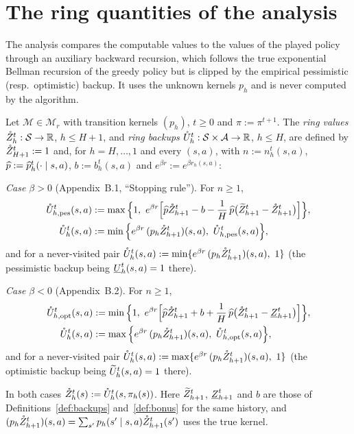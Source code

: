 \section{The ring quantities of the analysis}
\label{sec:algorithm_ring}

The analysis compares the computable values to the values of the played policy through an
auxiliary backward recursion, which follows the true exponential Bellman recursion of the
greedy policy but is clipped by the empirical pessimistic (resp.\ optimistic) backup. It uses
the unknown kernels $p_h$ and is never computed by the algorithm.

\begin{definition}\label{def:ring}
\leanok
{}
Let $\mathcal M \in \mathcal M_r$ with transition kernels $(p_h)$, $t \ge 0$ and $\pi := \pi^{t+1}$. The
\emph{ring values} $\mathring{Z}^t_h : \mathcal{S} \to \mathbb{R}$, $h \le H + 1$, and \emph{ring backups}
$\mathring{U}^t_h : \mathcal{S} \times \mathcal{A} \to \mathbb{R}$, $h \le H$, are defined by $\mathring{Z}^t_{H+1} := 1$ and, for $h = H, \dots, 1$
and every $(s, a)$, with $n := n_h^t(s, a)$, $\widehat{p} := \widehat{p}_h^t(\cdot \mid s, a)$, $b := b_h^t(s, a)$
and $e^{\beta r} := e^{\beta r_h(s, a)}$:

\emph{Case $\beta > 0$} (Appendix~B.1, ``Stopping rule''). For $n \ge 1$,
\begin{align*}
  \mathring{U}^t_{h, \mathrm{pes}}(s, a) &:= \max\Big\{ 1,\ e^{\beta r} \Big[ \widehat{p} \mathring{Z}^t_{h+1} - b - \frac1H\, \widehat{p}\big(\widetilde{Z}^t_{h+1} - \mathring{Z}^t_{h+1}\big) \Big] \Big\}, \\
  \mathring{U}^t_h(s, a) &:= \min\Big\{ e^{\beta r}\, (p_h \mathring{Z}^t_{h+1})(s, a),\ \mathring{U}^t_{h, \mathrm{pes}}(s, a) \Big\},
\end{align*}
and for a never-visited pair $\mathring{U}^t_h(s, a) := \min\{ e^{\beta r}\, (p_h \mathring{Z}^t_{h+1})(s, a),\ 1\}$
(the pessimistic backup being $\underline{U}^t_h(s, a) = 1$ there).

\emph{Case $\beta < 0$} (Appendix~B.2). For $n \ge 1$,
\begin{align*}
  \mathring{U}^t_{h, \mathrm{opt}}(s, a) &:= \min\Big\{ 1,\ e^{\beta r} \Big[ \widehat{p} \mathring{Z}^t_{h+1} + b + \frac1H\, \widehat{p}\big(\mathring{Z}^t_{h+1} - \underline{Z}^t_{h+1}\big) \Big] \Big\}, \\
  \mathring{U}^t_h(s, a) &:= \max\Big\{ e^{\beta r}\, (p_h \mathring{Z}^t_{h+1})(s, a),\ \mathring{U}^t_{h, \mathrm{opt}}(s, a) \Big\},
\end{align*}
and for a never-visited pair $\mathring{U}^t_h(s, a) := \max\{ e^{\beta r}\, (p_h \mathring{Z}^t_{h+1})(s, a),\ 1\}$
(the optimistic backup being $\widetilde{U}^t_h(s, a) = 1$ there).

In both cases $\mathring{Z}^t_h(s) := \mathring{U}^t_h(s, \pi_h(s))$. Here $\widetilde{Z}^t_{h+1}$, $\underline{Z}^t_{h+1}$ and $b$ are those
of Definitions~\ref{def:backups} and~\ref{def:bonus} for the same history, and
$(p_h \mathring{Z}^t_{h+1})(s, a) = \sum_{s'} p_h(s' \mid s, a)\mathring{Z}^t_{h+1}(s')$ uses the true kernel.
\end{definition}

